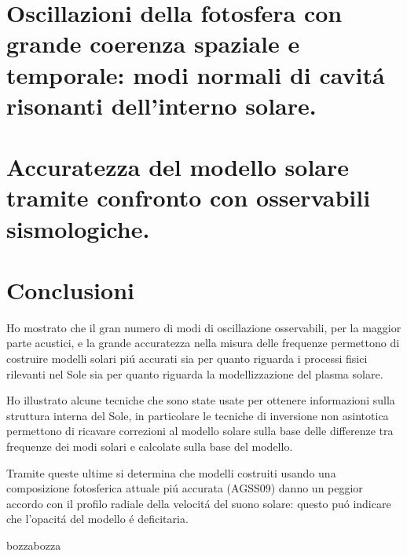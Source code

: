 \documentclass[twoside,11pt,fleqn]{memoir}%
\def\versione{bozza}%
\def\bozza{bozza}
\begin{document}
\cleartorecto
\part{Oscillazioni della fotosfera con grande coerenza spaziale e temporale: modi normali di cavit\'a risonanti dell'interno solare.}



\cleartorecto
\part{Accuratezza del modello solare tramite confronto con osservabili sismologiche.}



\part{Conclusioni}

\begin{workout}[Conclusioni]

Ho mostrato che il gran numero di modi di oscillazione osservabili, per la maggior parte acustici, e la grande accuratezza nella misura delle frequenze permettono di costruire modelli solari pi\'u accurati sia per quanto riguarda i processi fisici rilevanti nel Sole sia per quanto riguarda la modellizzazione del plasma solare.

Ho illustrato alcune tecniche che sono state usate per ottenere informazioni sulla struttura interna del Sole, in particolare le tecniche di inversione non asintotica permettono di ricavare correzioni al modello solare sulla base delle differenze tra frequenze dei modi solari e calcolate sulla base del modello.

Tramite queste ultime si determina che modelli costruiti usando una composizione fotosferica attuale pi\'u accurata (AGSS09) danno un peggior accordo con il profilo radiale della velocit\'a del suono solare: questo pu\'o indicare che l'opacit\'a del modello \'e deficitaria.

\end{workout}

{\let\clearpage\relax\let\cleardoublepage\relax
\backmatter
}

%
{\let\clearpage\relax\let\cleardoublepage\relax
\printbibliography
\listoffigures
}

\ifx\versione\bozza
\woc
\erratac
\fi
\end{document}
